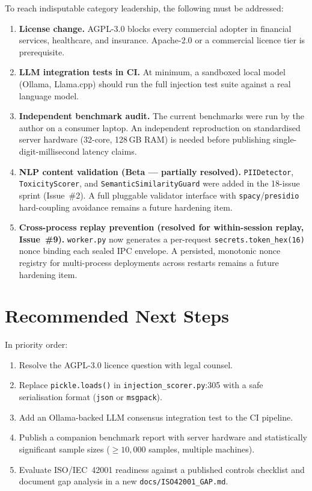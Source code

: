 \documentclass[12pt,a4paper,oneside]{report}
\newcommand{\fname}[1]{\texttt{#1}}          %
\newcommand{\code}[1]{\texttt{#1}}           %
\begin{document}
To reach indisputable category leadership, the following must be addressed:

\begin{enumerate}
  \item \textbf{License change.}  AGPL-3.0 blocks every commercial adopter
    in financial services, healthcare, and insurance.  Apache-2.0 or a
    commercial licence tier is prerequisite.

  \item \textbf{LLM integration tests in CI.}  At minimum, a sandboxed local
    model (Ollama, Llama.cpp) should run the full injection test suite against
    a real language model.

  \item \textbf{Independent benchmark audit.}  The current benchmarks were
    run by the author on a consumer laptop.  An independent reproduction on
    standardised server hardware (32-core, 128\,GB RAM) is needed before
    publishing single-digit-millisecond latency claims.

  \item \textbf{NLP content validation (Beta — partially resolved).}
    \code{PIIDetector}, \code{ToxicityScorer}, and
    \code{SemanticSimilarityGuard} were added in the 18-issue sprint
    (Issue~\#2).  A full pluggable validator interface with
    \code{spacy}/\code{presidio} hard-coupling avoidance remains a future
    hardening item.

  \item \textbf{Cross-process replay prevention (resolved for
    within-session replay, Issue~\#9).}  \fname{worker.py} now generates
    a per-request \code{secrets.token\_hex(16)} nonce binding each sealed
    IPC envelope.  A persisted, monotonic nonce registry for multi-process
    deployments across restarts remains a future hardening item.
\end{enumerate}

\section{Recommended Next Steps}

In priority order:

\begin{enumerate}
  \item Resolve the AGPL-3.0 licence question with legal counsel.
  \item Replace \code{pickle.loads()} in \fname{injection\_scorer.py}:305
    with a safe serialisation format (\code{json} or \code{msgpack}).
  \item Add an Ollama-backed LLM consensus integration test to the CI
    pipeline.
  \item Publish a companion benchmark report with server hardware and
    statistically significant sample sizes (\(\geq 10{,}000\) samples, multiple
    machines).
  \item Evaluate ISO/IEC~42001 readiness against a published controls
    checklist and document gap analysis in a new \fname{docs/ISO42001\_GAP.md}.
\end{enumerate}
\end{document}
